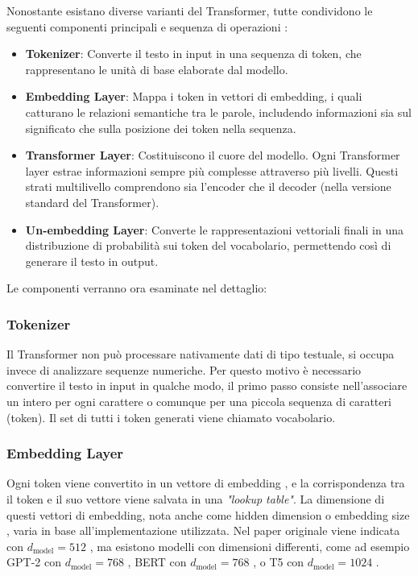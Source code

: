 Nonostante esistano diverse varianti del Transformer, tutte condividono le seguenti componenti principali e sequenza di operazioni \cite{phuong2022formalalgorithmstransformers}:
\begin{itemize}
	\item \textbf{Tokenizer}: Converte il testo in input in una sequenza di token, che rappresentano le unità di base elaborate dal modello.
	\item \textbf{Embedding Layer}: Mappa i token in vettori di embedding, i quali catturano le relazioni semantiche tra le parole, includendo informazioni sia sul significato che sulla posizione dei token nella sequenza.
	\item \textbf{Transformer Layer}: Costituiscono il cuore del modello. Ogni Transformer layer estrae informazioni sempre più complesse attraverso più livelli. Questi strati multilivello comprendono sia l'encoder che il decoder (nella versione standard del Transformer).
	\item \textbf{Un-embedding Layer}: Converte le rappresentazioni vettoriali finali in una distribuzione di probabilità sui token del vocabolario, permettendo così di generare il testo in output.
\end{itemize}
Le componenti verranno ora esaminate nel dettaglio:

\subsubsection{Tokenizer}
Il Transformer non può processare nativamente dati di tipo testuale, si occupa invece di analizzare sequenze numeriche. Per questo motivo è necessario convertire il testo in input in qualche modo, il primo passo consiste nell'associare un intero per ogni carattere o comunque per una piccola sequenza di caratteri (token). Il set di tutti i token generati viene chiamato vocabolario.

\subsubsection{Embedding Layer}
Ogni token viene convertito in un vettore di embedding \cite{mikolov2013distributedrepresentationswordsphrases}, e la corrispondenza tra il token e il suo vettore viene salvata in una \textit{"lookup table"}. La dimensione di questi vettori di embedding, nota anche come hidden dimension \cite{gpt2backbone} o embedding size \cite{devlin2019bertpretrainingdeepbidirectional}, varia in base all'implementazione utilizzata. Nel paper originale viene indicata con $d_{\text{model}} = 512$ \cite{vaswani2023attentionneed}, ma esistono modelli con dimensioni differenti, come ad esempio GPT-2 con $d_{\text{model}} = 768$ \cite{gpt2backbone}, BERT con $d_{\text{model}} = 768$ \cite{devlin2019bertpretrainingdeepbidirectional}, o T5 con $d_{\text{model}} = 1024$ \cite{raffel2023exploringlimitstransferlearning}.

